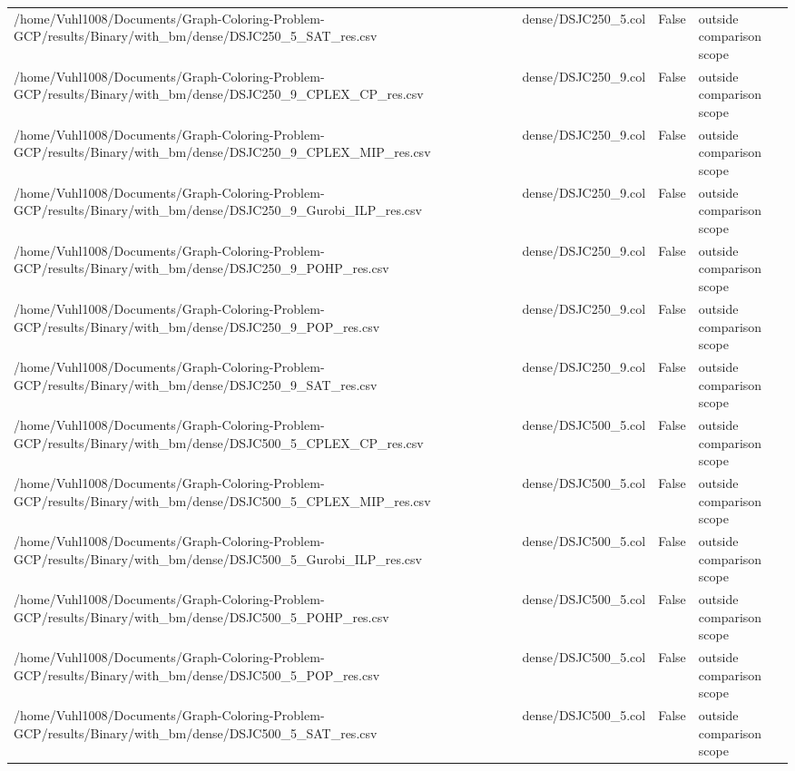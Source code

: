 \begin{table}[htbp]
\begin{tabular}{llll}
/home/Vuhl1008/Documents/Graph-Coloring-Problem-GCP/results/Binary/with\_bm/dense/DSJC250\_5\_SAT\_res.csv & dense/DSJC250\_5.col & False & outside comparison scope \\
/home/Vuhl1008/Documents/Graph-Coloring-Problem-GCP/results/Binary/with\_bm/dense/DSJC250\_9\_CPLEX\_CP\_res.csv & dense/DSJC250\_9.col & False & outside comparison scope \\
/home/Vuhl1008/Documents/Graph-Coloring-Problem-GCP/results/Binary/with\_bm/dense/DSJC250\_9\_CPLEX\_MIP\_res.csv & dense/DSJC250\_9.col & False & outside comparison scope \\
/home/Vuhl1008/Documents/Graph-Coloring-Problem-GCP/results/Binary/with\_bm/dense/DSJC250\_9\_Gurobi\_ILP\_res.csv & dense/DSJC250\_9.col & False & outside comparison scope \\
/home/Vuhl1008/Documents/Graph-Coloring-Problem-GCP/results/Binary/with\_bm/dense/DSJC250\_9\_POHP\_res.csv & dense/DSJC250\_9.col & False & outside comparison scope \\
/home/Vuhl1008/Documents/Graph-Coloring-Problem-GCP/results/Binary/with\_bm/dense/DSJC250\_9\_POP\_res.csv & dense/DSJC250\_9.col & False & outside comparison scope \\
/home/Vuhl1008/Documents/Graph-Coloring-Problem-GCP/results/Binary/with\_bm/dense/DSJC250\_9\_SAT\_res.csv & dense/DSJC250\_9.col & False & outside comparison scope \\
/home/Vuhl1008/Documents/Graph-Coloring-Problem-GCP/results/Binary/with\_bm/dense/DSJC500\_5\_CPLEX\_CP\_res.csv & dense/DSJC500\_5.col & False & outside comparison scope \\
/home/Vuhl1008/Documents/Graph-Coloring-Problem-GCP/results/Binary/with\_bm/dense/DSJC500\_5\_CPLEX\_MIP\_res.csv & dense/DSJC500\_5.col & False & outside comparison scope \\
/home/Vuhl1008/Documents/Graph-Coloring-Problem-GCP/results/Binary/with\_bm/dense/DSJC500\_5\_Gurobi\_ILP\_res.csv & dense/DSJC500\_5.col & False & outside comparison scope \\
/home/Vuhl1008/Documents/Graph-Coloring-Problem-GCP/results/Binary/with\_bm/dense/DSJC500\_5\_POHP\_res.csv & dense/DSJC500\_5.col & False & outside comparison scope \\
/home/Vuhl1008/Documents/Graph-Coloring-Problem-GCP/results/Binary/with\_bm/dense/DSJC500\_5\_POP\_res.csv & dense/DSJC500\_5.col & False & outside comparison scope \\
/home/Vuhl1008/Documents/Graph-Coloring-Problem-GCP/results/Binary/with\_bm/dense/DSJC500\_5\_SAT\_res.csv & dense/DSJC500\_5.col & False & outside comparison scope \\

\end{tabular}
\end{table}
